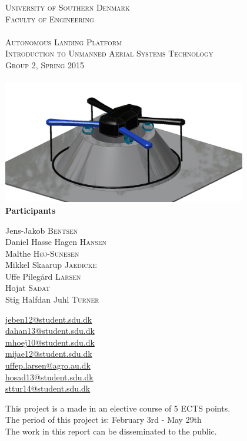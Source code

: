 \begin{titlepage}
\begin{center}
	
	\textsc{\LARGE{University of Southern Denmark\\Faculty of Engineering}}\\[1.5cm]
	\HRule \\[0.4cm]
	\textsc{\huge{Autonomous Landing Platform}}\\
	\textsc{\Large{Introduction to Unmanned Aerial Systems Technology\\Group 2, Spring 2015}}\\[0.4cm]
	\HRule \\[1.5cm]
	\includegraphics[width=0.8\textwidth]{imgs/frontpage}~\\[1.5cm]
	\textbf{Participants}\\
	\begin{minipage}[t]{0.48\textwidth}
		\begin{flushright}
			Jens-Jakob \textsc{Bentsen}\\
			Daniel Hasse Hagen \textsc{Hansen}\\
			Malthe \textsc{Høj-Sunesen}\\
			Mikkel Skaarup \textsc{Jaedicke}\\
			Uffe Pilegård \textsc{Larsen}\\
			Hojat \textsc{Sadat}\\
			Stig Halfdan Juhl \textsc{Turner}\\
		\end{flushright}
	\end{minipage}
	\hfill
	\begin{minipage}[t]{0.48\textwidth}
		\begin{flushleft}
			\url{jeben12@student.sdu.dk}\\
			\url{dahan13@student.sdu.dk}\\
			\url{mhoej10@student.sdu.dk}\\
			\url{mijae12@student.sdu.dk}\\
			\url{uffep.larsen@agro.au.dk}\\
			\url{hosad13@student.sdu.dk}\\
			\url{sttur14@student.sdu.dk}\\
		\end{flushleft} 
	\end{minipage}
	\vfill
	\large{This project is a made in an elective course of 5 ECTS points. \\
		The period of this project is: February 3rd - May 29th\\
		The work in this report can be disseminated to the public.}
\end{center}
\end{titlepage}